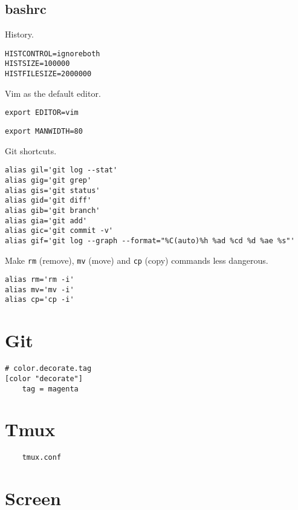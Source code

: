 \documentclass{article}
\begin{document}
\subsection{bashrc}

History.

\begin{verbatim}
HISTCONTROL=ignoreboth
HISTSIZE=100000
HISTFILESIZE=2000000
\end{verbatim}

Vim as the default editor.

\begin{verbatim}
export EDITOR=vim
\end{verbatim}

\begin{verbatim}
export MANWIDTH=80
\end{verbatim}

Git shortcuts.

\begin{verbatim}
alias gil='git log --stat'
alias gig='git grep'
alias gis='git status'
alias gid='git diff'
alias gib='git branch'
alias gia='git add'
alias gic='git commit -v'
alias gif='git log --graph --format="%C(auto)%h %ad %cd %d %ae %s"'
\end{verbatim}

Make \texttt{rm} (remove), \texttt{mv} (move) and \texttt{cp} (copy) commands less dangerous.

\begin{verbatim}
alias rm='rm -i'
alias mv='mv -i'
alias cp='cp -i'
\end{verbatim}

\section{Git}

\begin{verbatim}
# color.decorate.tag
[color "decorate"]
	tag = magenta
\end{verbatim}

\section{Tmux}

\begin{verbatim}
	tmux.conf
\end{verbatim}

\section{Screen}
\end{document}
